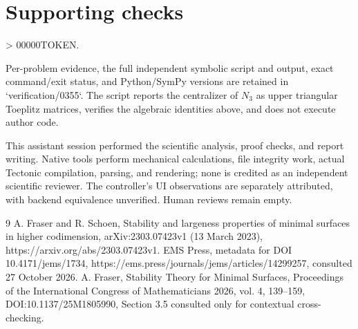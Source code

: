 \documentclass[10pt]{article}
\begin{document}
\section*{Supporting checks}
> 00000TOKEN.\par
Per-problem evidence, the full independent symbolic script and output, exact command/exit status, and Python/SymPy versions are retained in `verification/0355`. The script reports the centralizer of \(N_3\) as upper triangular Toeplitz matrices, verifies the algebraic identities above, and does not execute author code.\par
This assistant session performed the scientific analysis, proof checks, and report writing. Native tools perform mechanical calculations, file integrity work, actual Tectonic compilation, parsing, and rendering; none is credited as an independent scientific reviewer. The controller’s UI observations are separately attributed, with backend equivalence unverified. Human reviews remain empty.\par
9 A. Fraser and R. Schoen, Stability and largeness properties of minimal surfaces in higher codimension, arXiv:2303.07423v1 (13 March 2023), https://arxiv.org/abs/2303.07423v1. EMS Press, metadata for DOI 10.4171/jems/1734, https://ems.press/journals/jems/articles/14299257, consulted 27 October 2026. A. Fraser, Stability Theory for Minimal Surfaces, Proceedings of the International Congress of Mathematicians 2026, vol. 4, 139–159, DOI:10.1137/25M1805990, Section 3.5 consulted only for contextual cross-checking.\par
\end{document}

